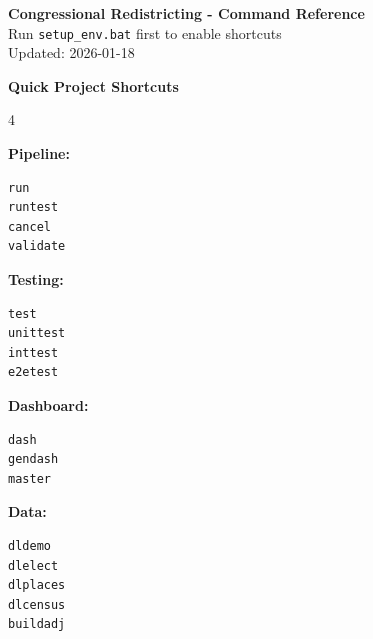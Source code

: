 \documentclass[10pt,landscape]{article}
\begin{document}
\begin{center}
\textbf{\LARGE Congressional Redistricting - Command Reference}\\
\vspace{4pt}
\large Run \texttt{setup\_env.bat} first to enable shortcuts\\
\vspace{2pt}
\normalsize Updated: 2026-01-18
\end{center}

\vspace{6pt}

\begin{tcolorbox}[colback=highlightbg,colframe=sectioncolor,boxrule=1pt,arc=2pt,left=6pt,right=6pt,top=4pt,bottom=4pt]
\textbf{\large Quick Project Shortcuts}

\vspace{4pt}

\begin{multicols}{4}
\raggedright

\textbf{Pipeline:}
\begin{Verbatim}[fontsize=\normalsize,frame=none]
run
runtest
cancel
validate
\end{Verbatim}

\columnbreak

\textbf{Testing:}
\begin{Verbatim}[fontsize=\normalsize,frame=none]
test
unittest
inttest
e2etest
\end{Verbatim}

\columnbreak

\textbf{Dashboard:}
\begin{Verbatim}[fontsize=\normalsize,frame=none]
dash
gendash
master
\end{Verbatim}

\columnbreak

\textbf{Data:}
\begin{Verbatim}[fontsize=\normalsize,frame=none]
dldemo
dlelect
dlplaces
dlcensus
buildadj
\end{Verbatim}

\end{multicols}
\end{tcolorbox}

\vspace{4pt}
\end{document}
